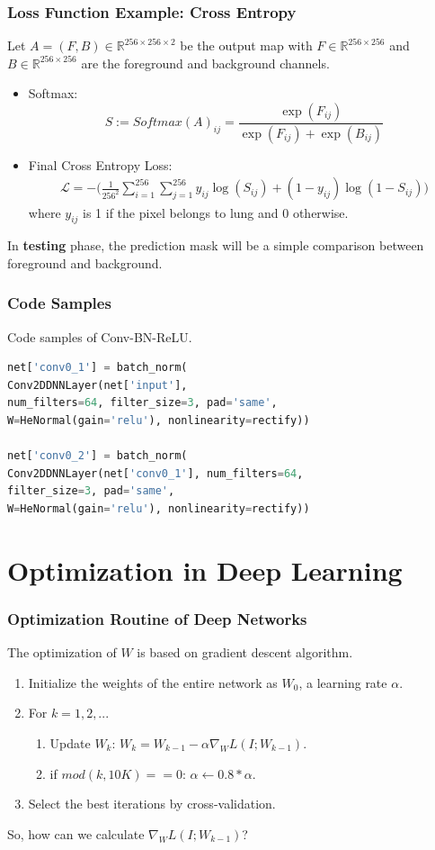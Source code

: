 \documentclass[10pt]{beamer}
\newcommand{\R}{{\mathbb R}}
\begin{document}
\begin{frame}
\frametitle{Loss Function Example: Cross Entropy}
Let $A = (F, B) \in \R^{256\times 256 \times 2}$ be the output map with $F \in \R^{256\times 256}$ and $B \in \R^{256 \times 256}$ are the foreground and background channels. 
\begin{itemize}
	\item Softmax: 
	\[
	S := Softmax(A)_{ij} = \frac{\exp(F_{ij})}{\exp(F_{ij}) + \exp(B_{ij})}
	\]
	\item Final Cross Entropy Loss:
	\begin{align*}
	\mathcal{L} = -\bigg(\frac{1}{256^2}\sum_{i=1}^{256} \sum_{j=1}^{256}y_{ij} \log(S_{ij}) + (1-y_{ij}) \log(1-S_{ij})\bigg)
	\end{align*}
	where $y_{ij}$ is 1 if the pixel belongs to lung and 0 otherwise.
\end{itemize}
In \textbf{testing} phase, the prediction mask will be a simple comparison between foreground and background.
\end{frame}

\begin{frame}[fragile]
\frametitle{Code Samples}
Code samples of Conv-BN-ReLU.
\begin{lstlisting}[language=Python,keywordstyle=\color{red}]
net['conv0_1'] = batch_norm(
Conv2DDNNLayer(net['input'], 
num_filters=64, filter_size=3, pad='same', 
W=HeNormal(gain='relu'), nonlinearity=rectify))

net['conv0_2'] = batch_norm(
Conv2DDNNLayer(net['conv0_1'], num_filters=64, 
filter_size=3, pad='same',
W=HeNormal(gain='relu'), nonlinearity=rectify))
\end{lstlisting}

\end{frame}


\section{Optimization in Deep Learning}
\begin{frame}
	\frametitle{Optimization Routine of Deep Networks}
	The optimization of $W$ is based on gradient descent algorithm.
	\begin{enumerate}
		\item Initialize the weights  of the entire network as $W_0$, a learning rate $\alpha$.
		\item For $k = 1,2, ...$
		\begin{enumerate}
			\item Update $W_k$: $W_k = W_{k-1} - \alpha \nabla_W L(I;W_{k-1})$.
			\item if $mod(k, 10K) == 0$: $\alpha \leftarrow 0.8*\alpha$.
		\end{enumerate}
		\item Select the best iterations by cross-validation.
	\end{enumerate}
So, how can we calculate $\nabla_W L(I;W_{k-1})$?
\end{frame}
\end{document}
